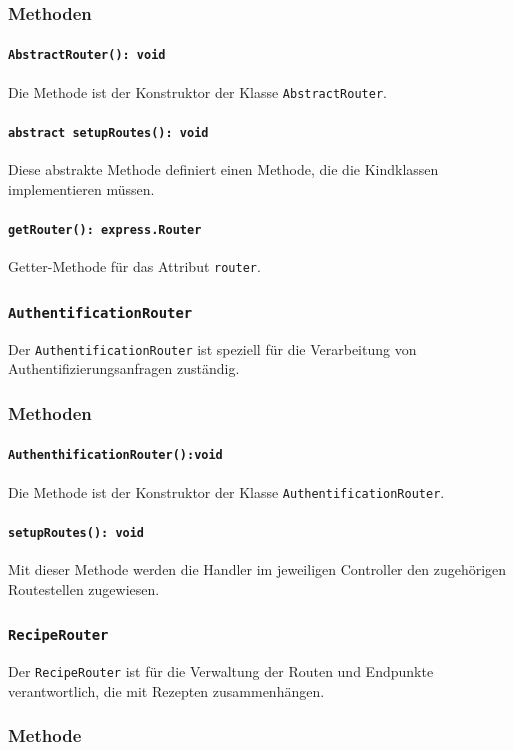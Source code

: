 \documentclass{entwurfsheft}
\begin{document}
\subsubsection*{Methoden}
\paragraph{\texttt{AbstractRouter(): void}}
Die Methode ist der Konstruktor der Klasse \texttt{AbstractRouter}.
\paragraph{\texttt{abstract setupRoutes(): void}}
Diese abstrakte Methode definiert einen Methode, die die Kindklassen implementieren müssen.
\paragraph{\texttt{getRouter(): express.Router}}
Getter-Methode für das Attribut \texttt{router}.


\subsubsection{\texttt{AuthentificationRouter}}\label{sec:AuthentificationRouter}
Der \texttt{AuthentificationRouter} ist speziell für die Verarbeitung von Authentifizierungsanfragen zuständig.
\subsubsection*{Methoden}
\paragraph{\texttt{AuthenthificationRouter():void}}
Die Methode ist der Konstruktor der Klasse \texttt{AuthentificationRouter}.
\paragraph{\texttt{setupRoutes(): void}}
Mit dieser Methode werden die Handler im jeweiligen Controller den zugehörigen Routestellen zugewiesen.

\subsubsection{\texttt{RecipeRouter}}\label{sec:RecipeRouter}
Der \texttt{RecipeRouter} ist für die Verwaltung der Routen und Endpunkte verantwortlich, die mit Rezepten zusammenhängen.
\subsubsection*{Methode}
\end{document}
